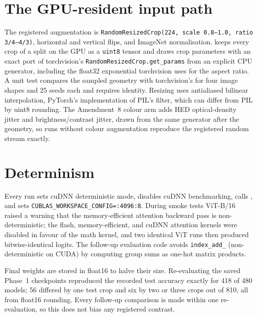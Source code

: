 \section{The GPU-resident input path}
\label{r:ch:gpuaug}



The registered augmentation is \texttt{RandomResizedCrop(224, scale 0.8--1.0, ratio 3/4--4/3)}, horizontal and vertical
flips, and ImageNet normalisation.  keeps every crop of a split on the GPU as a
\texttt{uint8} tensor and draws crop parameters with an exact port of torchvision's \texttt{RandomResizedCrop.get\_params}
from an explicit CPU generator, including the float32 exponential torchvision uses for the aspect ratio. A unit test
compares the sampled geometry with torchvision's for four image shapes and 25 seeds each and requires identity. Resizing
uses antialiased bilinear interpolation, PyTorch's implementation of PIL's filter, which can differ from PIL by uint8
rounding. The Amendment~8 colour arm adds HED optical-density jitter and brightness/contrast jitter, drawn from the same
generator after the geometry, so runs without colour augmentation reproduce the registered random stream exactly.

\section{Determinism}
\label{r:ch:determinism}

Every run sets cuDNN deterministic mode, disables cuDNN benchmarking, calls
, and sets \texttt{CUBLAS\_WORKSPACE\_CONFIG=:4096:8}.
During smoke tests ViT-B/16 raised a warning that the memory-efficient attention backward pass is non-deterministic; the
flash, memory-efficient, and cuDNN attention kernels were disabled in favour of the math kernel, and two identical ViT
runs then produced bitwise-identical logits. The follow-up evaluation code avoids \texttt{index\_add\_} (non-deterministic
on CUDA) by computing group sums as one-hot matrix products.

Final weights are stored in float16 to halve their size. Re-evaluating the saved Phase~1 checkpoints reproduced the
recorded test accuracy exactly for 418 of 480 models; 56 differed by one test crop and six by two or three crops out of
810, all from float16 rounding. Every follow-up comparison is made within one re-evaluation, so this does not bias any
registered contrast.


